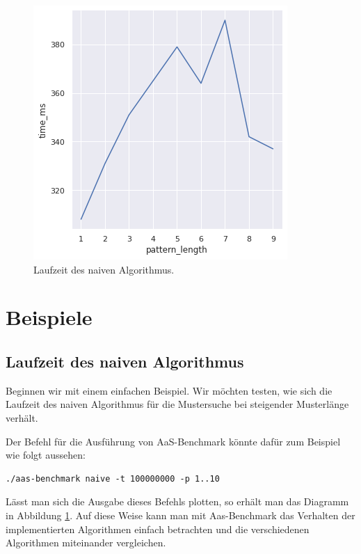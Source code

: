 \documentclass[twocolumn]{article}
\begin{document}
\begin{figure}[h]
    \includegraphics[width=\linewidth]{assets/graph_1.png}
    \caption{Laufzeit des naiven Algorithmus.}
    \label{fig:runtime_naive}
\end{figure}

\section{Beispiele}

\subsection*{Laufzeit des naiven Algorithmus}

Beginnen wir mit einem einfachen Beispiel. Wir möchten testen, wie sich die Laufzeit des naiven Algorithmus für die Mustersuche bei steigender Musterlänge verhält.

Der Befehl für die Ausführung von AaS-Benchmark könnte dafür zum Beispiel wie folgt aussehen:

\begin{lstlisting}[breaklines=true,autogobble=true]
    ./aas-benchmark naive -t 100000000 -p 1..10
\end{lstlisting}

Lässt man sich die Ausgabe dieses Befehls plotten, so erhält man das Diagramm in Abbildung \ref{fig:runtime_naive}. Auf diese Weise kann man mit Aas-Benchmark das Verhalten der implementierten Algorithmen einfach betrachten und die verschiedenen Algorithmen miteinander vergleichen.
\end{document}
